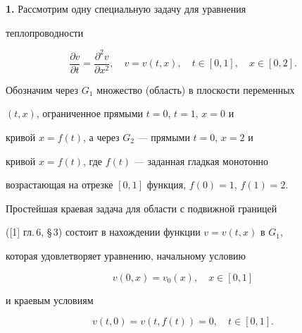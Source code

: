 \pagestyle{plain} %













\maketitle


\label{begin}





{\bf 1.} Рассмотрим одну специальную задачу для уравнения


теплопроводности


\begin{equation}


\frac{\partial v}{\partial t}=


\frac{\partial^2 v}{\partial x^2},\quad


v=v(t,x),\quad t\in [0,1],\quad x\in [0,2].


\end{equation}


Обозначим через $G_1$ множество (область) в плоскости переменных


$(t,x)$, ограниченное прямыми $t=0$, $t=1$, $x=0$ и


кривой $x=f(t)$, а через $G_2$ --- прямыми $t=0$, $x=2$ и


кривой $x=f(t)$, где $f(t)$ --- заданная гладкая монотонно


возрастающая на отрезке $[0,1]$ функция, $f(0)=1$, $f(1)=2$.


Простейшая краевая задача для области с подвижной границей


([1] гл.\,6, \S\,3) состоит в нахождении функции $v=v(t,x)$ в $G_1$,


которая удовлетворяет уравнению, начальному условию


\begin{equation}


v(0,x)=v_0(x),\quad x\in [0,1]


\end{equation}


и краевым условиям


\begin{equation}


v(t,0)=v(t,f(t))=0,\quad t\in [0,1].


\end{equation}


